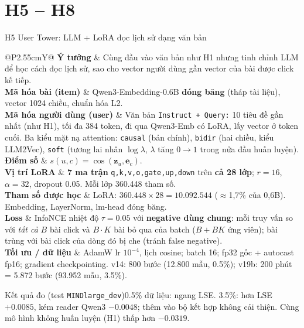 \documentclass[aspectratio=169,t]{beamer}
\makeatletter
\newcommand{\code}[1]{\texttt{#1}}
\newcommand{\bangmota}[1]{{\scriptsize\renewcommand{\arraystretch}{1.1}\setlength{\tabcolsep}{4pt}%
  \begin{tabularx}{\textwidth}{@{}P{2.55cm}Y@{}}\toprule #1 \bottomrule\end{tabularx}}}
\newcommand{\rw}[2]{\textbf{#1} & #2\\ \midrule}
\newcommand{\rwl}[2]{\textbf{#1} & #2\\}
\newcommand{\ketqua}[1]{\begin{exampleblock}{Kết quả đo (test \code{MINDlarge\_dev})}\scriptsize #1\end{exampleblock}}
\makeatother
\begin{document}
\section{H5 -- H8}
\begin{frame}[shrink]{H5 \textperiodcentered{} User Tower: LLM + LoRA đọc lịch sử dạng văn bản}
\bangmota{
\rw{Ý tưởng}{Cùng đầu vào văn bản như H1 nhưng tinh chỉnh LLM để học cách đọc lịch sử, sao cho vector người dùng gần vector của bài được click kế tiếp.}
\rw{Mã hóa bài (item)}{Qwen3-Embedding-0.6B \textbf{đóng băng} (tháp tài liệu), vector 1024 chiều, chuẩn hóa L2.}
\rw{Mã hóa người dùng (user)}{Văn bản \code{Instruct + Query:} 10 tiêu đề gần nhất (như H1), tối đa 384 token, đi qua Qwen3-Emb có LoRA, lấy vector ở token cuối. Ba kiểu mặt nạ attention: \code{causal} (bản chính), \code{bidir} (hai chiều, kiểu LLM2Vec), \code{soft} (tương lai nhân $\log\lambda$, $\lambda$ tăng $0\to1$ trong nửa đầu huấn luyện).}
\rw{Điểm số}{$s(u,c)=\cos(\mathbf z_u,\mathbf e_c)$.}
\rw{Vị trí LoRA}{\textbf{7 ma trận} \code{q,k,v,o,gate,up,down} trên \textbf{cả 28 lớp}; $r=16$, $\alpha=32$, dropout 0.05. Mỗi lớp 360.448 tham số.}
\rw{Tham số được học}{LoRA: $360.448\times28=\mathbf{10.092.544}$ ($\approx$1,7\% của 0,6B). Embedding, LayerNorm, lm-head đóng băng.}
\rw{Loss}{InfoNCE nhiệt độ $\tau=0.05$ với \textbf{negative dùng chung}: mỗi truy vấn so với \emph{tất cả} $B$ bài click và $B\cdot K$ bài bỏ qua của batch ($B+BK$ ứng viên); bài trùng với bài click của dòng đó bị che (tránh false negative).}
\rwl{Tối ưu / dữ liệu}{AdamW lr $10^{-4}$, lịch cosine; batch 16; fp32 gốc + autocast fp16; gradient checkpointing. v14: 800 bước (12.800 mẫu, 0.5\%); v19b: 200 phút = 5.872 bước (93.952 mẫu, 3.5\%).}
}
\ketqua{0.5\% dữ liệu: ngang LSE. 3.5\%: hơn LSE $+0.0085$, kém reader Qwen3 $-0.0048$; thêm vào bộ kết hợp không cải thiện. Cùng mô hình không huấn luyện (H1) thấp hơn $-0.0319$.}
\par\kern0pt
\end{frame}
\end{document}
